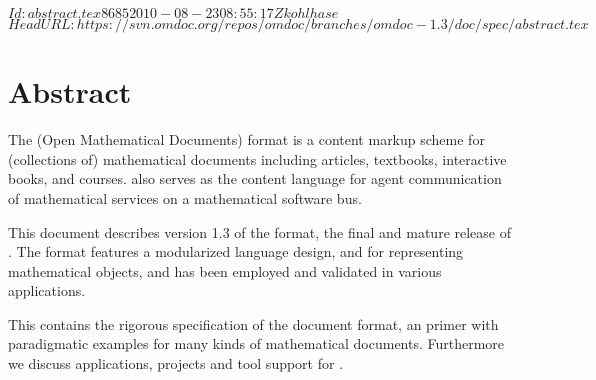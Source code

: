 \svnInfo $Id: abstract.tex 8685 2010-08-23 08:55:17Z kohlhase $
\svnKeyword $HeadURL: https://svn.omdoc.org/repos/omdoc/branches/omdoc-1.3/doc/spec/abstract.tex $

\section*{Abstract}
The {\omdoc} (Open Mathematical Documents) format is a content markup scheme for
(collections of) mathematical documents including articles, textbooks, interactive
books, and courses.  {\omdoc} also serves as the content language for agent
communication of mathematical services on a mathematical software bus.

This document describes version 1.3 of the {\omdoc} format, the final and mature
release of {}. The format features a modularized language design,
{\openmath} and {\mathml} for representing mathematical objects, and has been
employed and validated in various applications.

This {\report} contains the rigorous specification of the {\omdoc} document format, an
{\omdoc} primer with paradigmatic examples for many kinds of mathematical documents.
Furthermore we discuss applications, projects and tool support for {\omdoc}.




